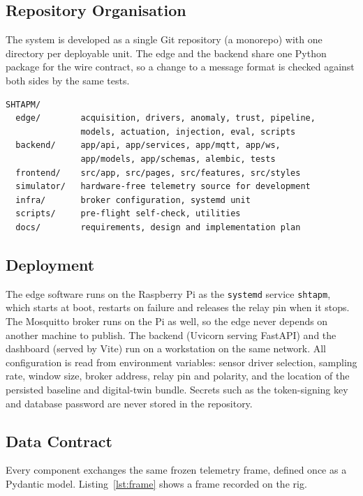 \subsection{Repository Organisation}

The system is developed as a single Git repository (a monorepo) with one directory per deployable unit. The edge and the backend share one Python package for the wire contract, so a change to a message format is checked against both sides by the same tests.

\begin{lstlisting}[float=htbp, caption={Top-level structure of the repository}, label={lst:tree}]
SHTAPM/
  edge/        acquisition, drivers, anomaly, trust, pipeline,
               models, actuation, injection, eval, scripts
  backend/     app/api, app/services, app/mqtt, app/ws,
               app/models, app/schemas, alembic, tests
  frontend/    src/app, src/pages, src/features, src/styles
  simulator/   hardware-free telemetry source for development
  infra/       broker configuration, systemd unit
  scripts/     pre-flight self-check, utilities
  docs/        requirements, design and implementation plan
\end{lstlisting}

\subsection{Deployment}

The edge software runs on the Raspberry Pi as the \texttt{systemd} service \texttt{shtapm}, which starts at boot, restarts on failure and releases the relay pin when it stops. The Mosquitto broker runs on the Pi as well, so the edge never depends on another machine to publish. The backend (Uvicorn serving FastAPI) and the dashboard (served by Vite) run on a workstation on the same network. All configuration is read from environment variables: sensor driver selection, sampling rate, window size, broker address, relay pin and polarity, and the location of the persisted baseline and digital-twin bundle. Secrets such as the token-signing key and database password are never stored in the repository.

\subsection{Data Contract}

Every component exchanges the same frozen telemetry frame, defined once as a Pydantic model. Listing~\ref{lst:frame} shows a frame recorded on the rig.

